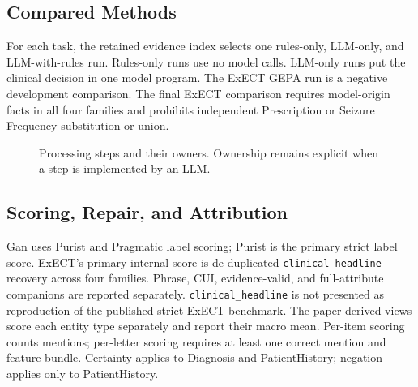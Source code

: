 \documentclass[conference]{IEEEtran}
\newcommand{\code}[1]{\texttt{#1}}
\begin{document}
\subsection{Compared Methods}

For each task, the retained evidence index selects one rules-only, LLM-only, and
LLM-with-rules run. Rules-only runs use no model calls. LLM-only runs put the
clinical decision in one model program. The ExECT GEPA run is a negative
development comparison. The final ExECT comparison requires model-origin facts
in all four families and prohibits independent Prescription or Seizure
Frequency substitution or union.

\begin{figure}[tbp]
\centering
{}
\caption{Processing steps and their owners. Ownership remains explicit when a
step is implemented by an LLM.}
\label{fig:pipeline}
\end{figure}

\subsection{Scoring, Repair, and Attribution}

Gan uses Purist and Pragmatic label scoring; Purist is the primary strict label
score. ExECT's primary internal score is de-duplicated
\code{clinical\_headline} recovery across four families. Phrase, CUI,
evidence-valid, and full-attribute companions are reported separately.
\code{clinical\_headline} is not presented as reproduction of the published
strict ExECT benchmark.
The paper-derived views score each entity type separately and report their macro
mean. Per-item scoring counts mentions; per-letter scoring requires at least one
correct mention and feature bundle. Certainty applies to Diagnosis and
PatientHistory; negation applies only to PatientHistory.
\end{document}
